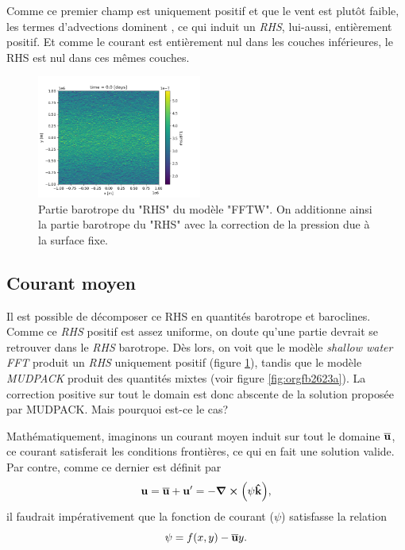 \documentclass[10pt]{article}
\numberwithin{equation}{section}
\newcommand{\kvf}{\vb{\hat{k}}}
\newcommand{\uu}{\vb{u}}
\begin{document}
Comme ce premier champ est uniquement positif et que le vent est plutôt faible, les termes d'advections dominent , ce qui induit un \emph{RHS}, lui-aussi, entièrement positif.
Et comme le courant est entièrement nul dans les couches inférieures, le RHS est nul dans ces mêmes couches. \bigskip

\begin{figure} \vspace{-\baselineskip} \centering
\centering
\includegraphics[width=0.48\textwidth]{figures/debuggage/2023_06_12_RHSuBTfftw.png}
\caption{\label{fig:orge391d82}Partie barotrope du "RHS" du modèle "FFTW". On additionne ainsi la partie barotrope du "RHS" avec la correction de la pression due à la surface fixe.}
\end{figure}

\subsection{Courant moyen}
\label{sec:org5ae1993}

Il est possible de décomposer ce RHS en quantités barotrope et baroclines.
Comme ce \emph{RHS} positif est assez uniforme, on doute qu'une partie devrait se retrouver dans le \emph{RHS} barotrope.
Dès lors, on voit que le modèle \emph{shallow water FFT} produit un \emph{RHS} uniquement positif (figure \ref{fig:orge391d82}), tandis que le modèle \emph{MUDPACK} produit des quantités mixtes (voir figure \ref{fig:orgfb2623a}).
La correction positive sur tout le domain est donc abscente de la solution proposée par MUDPACK.
Mais pourquoi est-ce le cas?\bigskip

Mathématiquement, imaginons un courant moyen induit sur tout le domaine \(\overline{\uu}\), ce courant satisferait les conditions frontières, ce qui en fait une solution valide.
Par contre, comme ce dernier est définit par
\begin{equation}
   \uu = \overline{\uu} + \uu' = - \curl(\psi\kvf),
\end{equation}
il faudrait impérativement que la fonction de courant (\(\psi\)) satisfasse la relation
\begin{equation}
\label{eq:orgfc2453d}
   \psi = f(x,y) - \overline{\uu} y.
\end{equation}
\end{document}

